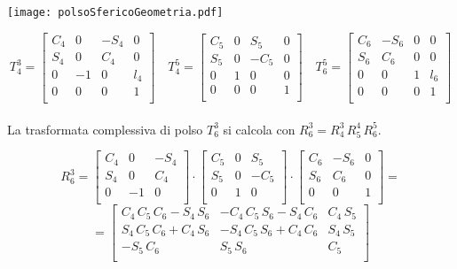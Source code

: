 \texttt{[image: polsoSfericoGeometria.pdf]}

\begin{equation}
	T_4^3 = 
	\begin{bmatrix}
		C_4 & 0 & -S_4 & 0 \\
		S_4 & 0 & C_4 & 0 \\
		0 & -1 & 0 & l_4 \\
		0 & 0 & 0 & 1 \\
	\end{bmatrix}
	\quad T_4^5 =
	\begin{bmatrix}
		C_5 & 0 & S_5 & 0 \\
		S_5 & 0 & -C_5 & 0 \\
		0 & 1 & 0 & 0 \\
		0 & 0 & 0 & 1 \\
	\end{bmatrix}
	\quad T_6^5 = 
	\begin{bmatrix}
		C_6 & -S_6 & 0 & 0 \\
		S_6 & C_6 & 0 & 0 \\
		0 & 0 & 1 & l_6 \\
		0 & 0 & 0 & 1 \\
	\end{bmatrix}
\end{equation}

\paragraph{}
La trasformata complessiva di polso $T_6^3$ si calcola con $R_6^3 = R_4^3\,R_5^4\,R_6^5$.

\begin{equation*}
	R_6^3 = 
	\begin{bmatrix}
		C_4 & 0 & -S_4 \\
		S_4 & 0 & C_4 \\
		0 & -1 & 0 \\
	\end{bmatrix}
	\cdot
	\begin{bmatrix}
		C_5 & 0 & S_5 \\
		S_5 & 0 & -C_5 \\
		0 & 1 & 0 \\
	\end{bmatrix}
	\cdot
	\begin{bmatrix}
		C_6 & -S_6 & 0 \\
		S_6 & C_6 & 0 \\
		0 & 0 & 1 \\
	\end{bmatrix}
	=
\end{equation*}
\begin{equation}
	= 
	\begin{bmatrix}
		C_4\,C_5\,C_6 - S_4\,S_6 & -C_4\,C_5\,S_6 - S_4\,C_6 & C_4\,S_5 \\
		S_4\,C_5\,C_6 + C_4\,S_6 & -S_4\,C_5\,S_6 + C_4\,C_6 & S_4\,S_5 \\
		-S_5\,C_6 & S_5\,S_6 & C_5 \\
	\end{bmatrix}
\end{equation}


